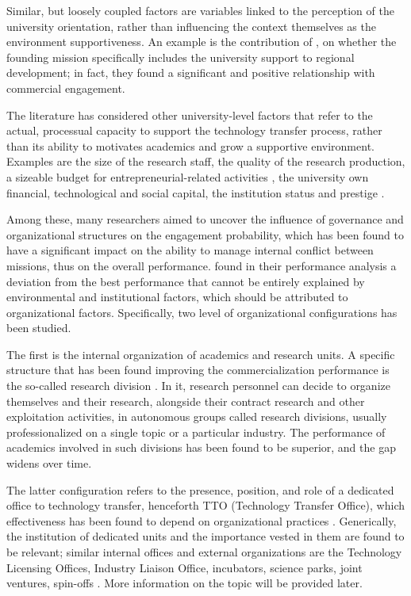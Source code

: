 Similar, but loosely coupled factors are variables linked to the perception of the university orientation, rather than influencing the context themselves as the environment supportiveness. An example is the contribution of \citet{DEste2007}, on whether the founding mission specifically includes the university support to regional development; in fact, they found a significant and positive relationship with commercial engagement.

The literature has considered other university-level factors that refer to the actual, processual capacity to support the technology transfer process, rather than its ability to motivates academics and grow a supportive environment. Examples are the size of the research staff, the quality of the research production, a sizeable budget for entrepreneurial-related activities \citep{Colombo2010}, the university own financial, technological and social capital, the institution status and prestige \citep{Guerrero2014}.

Among these, many researchers aimed to uncover the influence of governance and organizational structures on the engagement probability, which has been found to have a significant impact on the ability to manage internal conflict between missions, thus on the overall performance. \citet{Siegel2003a} found in their performance analysis a deviation from the best performance that cannot be entirely explained by environmental and institutional factors, which should be attributed to organizational factors. Specifically, two level of organizational configurations has been studied.

The first is the internal organization of academics and research units. A specific structure that has been found improving the commercialization performance is the so-called research division \citep{VanLooy2004}. In it, research personnel can decide to organize themselves and their research, alongside their contract research and other exploitation activities, in autonomous groups called research divisions, usually professionalized on a single topic or a particular industry. The performance of academics involved in such divisions has been found to be superior, and the gap widens over time.

The latter configuration refers to the presence, position, and role of a dedicated office to technology transfer, henceforth TTO (Technology Transfer Office), which effectiveness has been found to depend on organizational practices \citep{Siegel2003a}. Generically, the institution of dedicated units and the importance vested in them are found to be relevant; similar internal offices and external organizations are the Technology Licensing Offices, Industry Liaison Office, incubators, science parks, joint ventures, spin-offs \citep{Tijssen2006}. More information on the topic will be provided later.

